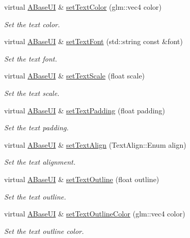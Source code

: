 \begin{DoxyCompactItemize}
virtual \hyperlink{class_a_base_u_i}{A\+Base\+UI} \& \hyperlink{class_a_base_u_i_a5d22d531f4fd1d59b9cfff0f2f3e4b8d}{set\+Text\+Color} (glm\+::vec4 color)
\begin{DoxyCompactList}\small\item\em Set the text color. \end{DoxyCompactList}\item 
virtual \hyperlink{class_a_base_u_i}{A\+Base\+UI} \& \hyperlink{class_a_base_u_i_a705188de51bf8387d38dca90740262a0}{set\+Text\+Font} (std\+::string const \&font)
\begin{DoxyCompactList}\small\item\em Set the text font. \end{DoxyCompactList}\item 
virtual \hyperlink{class_a_base_u_i}{A\+Base\+UI} \& \hyperlink{class_a_base_u_i_a980fa680f895fdefb7ee94ba022cd29b}{set\+Text\+Scale} (float scale)
\begin{DoxyCompactList}\small\item\em Set the text scale. \end{DoxyCompactList}\item 
virtual \hyperlink{class_a_base_u_i}{A\+Base\+UI} \& \hyperlink{class_a_base_u_i_ad414a59cf590b50f2d1f37891edf7284}{set\+Text\+Padding} (float padding)
\begin{DoxyCompactList}\small\item\em Set the text padding. \end{DoxyCompactList}\item 
virtual \hyperlink{class_a_base_u_i}{A\+Base\+UI} \& \hyperlink{class_a_base_u_i_a4a88d65cb4a5767c280e0849e56a519b}{set\+Text\+Align} (Text\+Align\+::\+Enum align)
\begin{DoxyCompactList}\small\item\em Set the text alignment. \end{DoxyCompactList}\item 
virtual \hyperlink{class_a_base_u_i}{A\+Base\+UI} \& \hyperlink{class_a_base_u_i_a1bafea512714350e238ef0cf0bd4e416}{set\+Text\+Outline} (float outline)
\begin{DoxyCompactList}\small\item\em Set the text outline. \end{DoxyCompactList}\item 
virtual \hyperlink{class_a_base_u_i}{A\+Base\+UI} \& \hyperlink{class_a_base_u_i_a5490ceb10f7b8184d11bd4cd32a6adeb}{set\+Text\+Outline\+Color} (glm\+::vec4 color)
\begin{DoxyCompactList}\small\item\em Set the text outline color. \end{DoxyCompactList}\item 

\end{DoxyCompactItemize}
